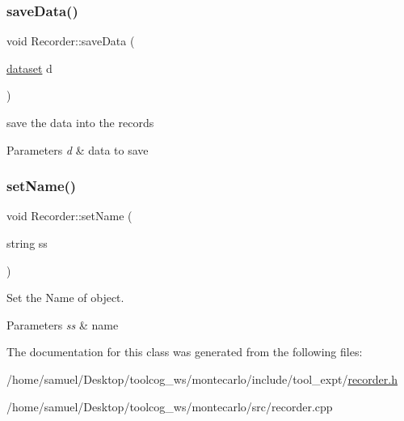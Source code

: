 \subsubsection{\texorpdfstring{save\+Data()}{saveData()}}
{\footnotesize\ttfamily void Recorder\+::save\+Data (\begin{DoxyParamCaption}\item[{\hyperlink{structdataset}{dataset}}]{d }\end{DoxyParamCaption})}



save the data into the records 


\begin{DoxyParams}{Parameters}
{\em d} & data to save \\
\hline
\end{DoxyParams}
\mbox{\label{classRecorder_a77bb320101cee41ef8c6e3c24829c0a9}} 
\subsubsection{\texorpdfstring{set\+Name()}{setName()}}
{\footnotesize\ttfamily void Recorder\+::set\+Name (\begin{DoxyParamCaption}\item[{string}]{ss }\end{DoxyParamCaption})\hspace{0.3cm}{\ttfamily [inline]}}



Set the Name of object. 


\begin{DoxyParams}{Parameters}
{\em ss} & name \\
\hline
\end{DoxyParams}


The documentation for this class was generated from the following files\+:\begin{DoxyCompactItemize}
\item 
/home/samuel/\+Desktop/toolcog\+\_\+ws/montecarlo/include/tool\+\_\+expt/\hyperlink{recorder_8h}{recorder.\+h}\item 
/home/samuel/\+Desktop/toolcog\+\_\+ws/montecarlo/src/recorder.\+cpp\end{DoxyCompactItemize}
